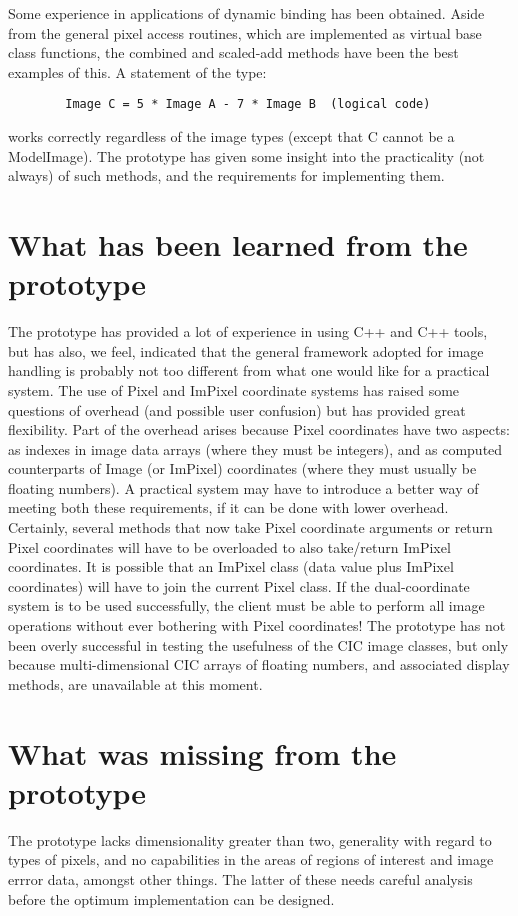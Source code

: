         Some experience in applications of dynamic binding has been obtained.
Aside from the general pixel access routines, which are implemented as virtual
base class functions, the combined and scaled-add methods have been the best
examples of this. A statement of the type:

\begin{verbatim}
        Image C = 5 * Image A - 7 * Image B  (logical code)
\end{verbatim}

works correctly regardless of the image types (except that C cannot be a
ModelImage). The prototype has given some insight into the practicality
(not always) of such methods, and the requirements for implementing them.


\section{What has been learned from the prototype}

        The prototype has provided a lot of experience in using C++ and
C++ tools, but has also, we feel, indicated that the general framework
adopted for image handling is probably not too different from what one would
like for a practical system. The use of Pixel and ImPixel coordinate systems
has raised some  questions of overhead (and possible user confusion) but has
provided great flexibility. Part of the overhead arises because Pixel 
coordinates have two aspects: as indexes in image data arrays (where they must
be integers), and as computed counterparts of Image (or ImPixel) coordinates
(where they must usually be floating numbers). A practical system may have
to introduce a better way of meeting both these requirements, if it can be
done with lower overhead. Certainly, several methods that now take Pixel
coordinate arguments or return Pixel coordinates will have to be overloaded
to also take/return ImPixel coordinates. It is possible that an ImPixel
class (data value plus ImPixel coordinates) will have to join the current
Pixel class. If the dual-coordinate system is to be used successfully, the
client must be able to perform all image operations without ever bothering
with Pixel coordinates!
     The prototype has not been overly successful in testing the usefulness
of the CIC image classes, but only because multi-dimensional CIC arrays
of floating numbers, and associated display methods, are unavailable at this
moment.


\section{What was missing from the prototype}

	The prototype lacks dimensionality greater than two, generality
with regard to types of pixels, and no capabilities in the areas of regions
of interest and image errror data, amongst other things. The latter of these
needs careful analysis before the optimum implementation can be designed.

